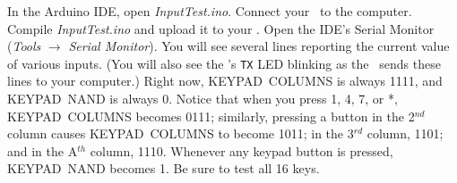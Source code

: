 
In the Arduino IDE, open \textit{InputTest.ino}.
Connect your \developmentboard\ to the computer.
Compile \textit{InputTest.ino} and upload it to your \developmentboard.
Open the IDE's Serial Monitor (\textit{Tools} $\rightarrow$ \textit{Serial Monitor}).
You will see several lines reporting the current value of various inputs. (You will also see the \developmentboard's \texttt{TX} LED blinking as the \developmentboard\ sends these lines to your computer.)
Right now, KEYPAD~COLUMNS is always 1111, and KEYPAD~NAND is always 0.
Notice that when you press 1, 4, 7, or *, KEYPAD~COLUMNS becomes 0111;
similarly, pressing a button in the 2$^{nd}$ column causes KEYPAD~COLUMNS to become 1011;
in the 3$^{rd}$ column, 1101;
and in the A$^{th}$ column, 1110.
Whenever any keypad button is pressed, KEYPAD~NAND becomes 1.
Be sure to test all 16 keys.